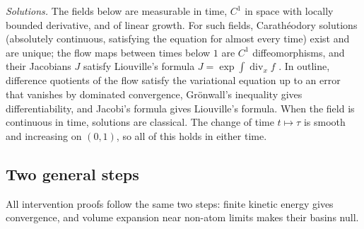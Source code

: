 \documentclass{article} %
\makeatletter
\newif\ificlr
\newcommand{\placeblock}[1]{\ificlr\@nameuse{moved@#1}\fi}
\theoremstyle{plain}
\theoremstyle{definition}
\theoremstyle{remark}
\makeatother
\begin{document}
\emph{Solutions.} The fields below are measurable in time, $C^1$ in space with locally bounded
derivative, and of linear growth. For such fields, Carath\'eodory solutions (absolutely
continuous, satisfying the equation for almost every time) exist and are unique; the flow maps
between times below $1$ are $C^1$ diffeomorphisms, and their Jacobians $J$ satisfy Liouville's
formula $J=\exp\int\operatorname{div}_x f$ \citep[Ch.~I]{hale1980ode}. In outline, difference
quotients of the flow satisfy the variational equation up to an error that vanishes by dominated
convergence, Gr\"onwall's inequality gives differentiability, and Jacobi's formula gives
Liouville's formula. When the field is continuous in time, solutions are classical. The change
of time $t\mapsto\tau$ is smooth and increasing on $(0,1)$, so all of this holds in either
time.

\subsection{Two general steps}
\label{apx:general-steps}

All intervention proofs follow the same two steps: finite kinetic energy gives convergence, and
volume expansion near non-atom limits makes their basins null.
\placeblock{template}
\end{document}
